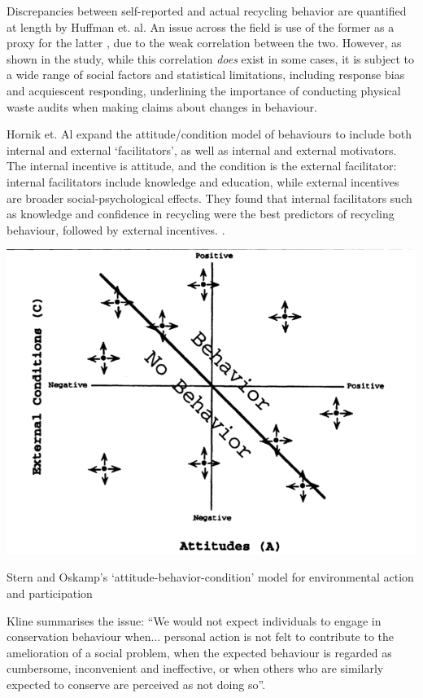 \documentclass[nofonts,nols,justified,nobib]{tufte-book}
\begin{document}
Discrepancies between self-reported and actual recycling behavior are quantified at length by Huffman et. al. An issue across the field is use of the former as a proxy for the latter \cite{varotto_psychological_2017, huffman_when_2014}, due to the weak correlation between the two. However, as shown in the study, while this correlation \emph{does} exist in some cases, it is subject to a wide range of social factors and statistical limitations, including response bias and acquiescent responding, underlining the importance of conducting physical waste audits when making claims about changes in behaviour.

Hornik et. Al expand the attitude/condition model of behaviours to include both internal and external `facilitators', as well as internal and external motivators. The internal incentive is attitude, and the condition is the external facilitator: internal facilitators include knowledge and education, while external incentives are broader social-psychological effects. They found that internal facilitators such as knowledge and confidence in recycling were the best predictors of recycling behaviour, followed by external incentives. \cite{Hornik_determinants_1995}. 

\begin{marginfigure}
\includegraphics[width=\textwidth]{img/1/attitude-condition.png}
\caption{Stern and Oskamp's `attitude-behavior-condition' model for environmental action and participation \cite{stern_managing_1987}}
\end{marginfigure}

Kline \cite{kline_rationalizing_1988} summarises the issue: ``We would not expect individuals to engage in conservation behaviour when... personal action is not felt to contribute to the amelioration of a social problem, when the expected behaviour is regarded as cumbersome, inconvenient and ineffective, or when others who are similarly expected to conserve are perceived as not doing so''.
\end{document}
